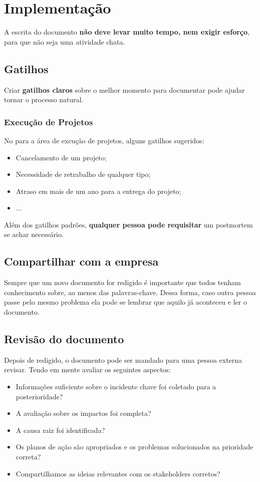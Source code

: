 \documentclass[a4paper, 12pt]{article}
\begin{document}
	\section{Implementação}
	A escrita do documento \textbf{não deve levar muito tempo, nem exigir esforço}, para que não seja uma atividade chata.
	
	\subsection{Gatilhos}
	Criar \textbf{gatilhos claros} sobre o melhor momento para documentar pode ajudar tornar o processo natural. 
	\subsubsection{Execução de Projetos}
	No para a área de excução de projetos, alguns gatilhos sugeridos:
		\begin{itemize}	
			\item Cancelamento de um projeto;
			\item Necessidade de retrabalho de qualquer tipo;
			\item Atraso em mais de um ano para a entrega do projeto;
			\item ...
		\end{itemize}
	
	Além dos gatilhos padrões, \textbf{qualquer pessoa pode requisitar} um postmortem se achar necessário.
	
	\subsection{Compartilhar com a empresa}
	Sempre que um novo documento for redigido é importante que todos tenham conhecimento sobre, ao menos das palavras-chave. Dessa forma, caso outra pessoa passe pelo mesmo problema ela pode se lembrar que aquilo já aconteceu e ler o documento.
	
	\subsection{Revisão do documento}
	Depois de redigido, o documento pode ser mandado para uma pessoa externa revisar. Tendo em mente avaliar os seguintes aspectos:
		\begin{itemize}	
			\item Informações suficiente sobre o incidente chave foi coletado para a posterioridade?
			\item A avaliação sobre os impactos foi completa?
			\item A causa raiz foi identificada?
			\item Os planos de ação são apropriados e os problemas solucionados na prioridade correta?
			\item Compartilhamos as ideias relevantes com os stakeholders corretos?
		\end{itemize}
	
\end{document}
